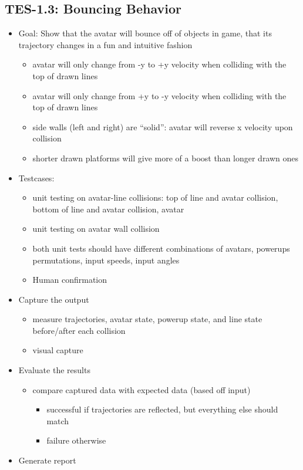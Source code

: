 \subsection{TES-1.3: Bouncing Behavior }
\label{bounce}
\begin{itemize}
\item Goal: Show that the avatar will bounce off of objects in game, that its trajectory changes in a fun and intuitive fashion 

\begin{itemize}
\item avatar will only change from -y to +y velocity when colliding with the top of drawn lines 
\item avatar will only change from +y to -y velocity when colliding with the top of drawn lines
\item side walls (left and right) are \textquotedblleft{}solid\textquotedblright{}: avatar will reverse x velocity upon collision
\item shorter drawn platforms will give more of a boost than longer drawn ones
\end{itemize}

\item Testcases: 
\begin{itemize}
\item unit testing on avatar-line collisions: top of line and avatar collision, bottom of line and avatar collision, avatar 
\item unit testing on avatar wall collision 
\item both unit tests should have different combinations of avatars, powerups permutations, input speeds, input angles
\item Human confirmation 
\end{itemize}

\item Capture the output 
\begin{itemize}
\item measure trajectories, avatar state, powerup state, and line state before/after each collision 
\item visual capture 
\end{itemize}

\item Evaluate the results
\begin{itemize}
\item compare captured data with expected data (based off input)
\begin{itemize}
\item successful if trajectories are reflected, but everything else should match
\item failure otherwise
\end{itemize}
\end{itemize}
\item Generate report 


\end{itemize}
